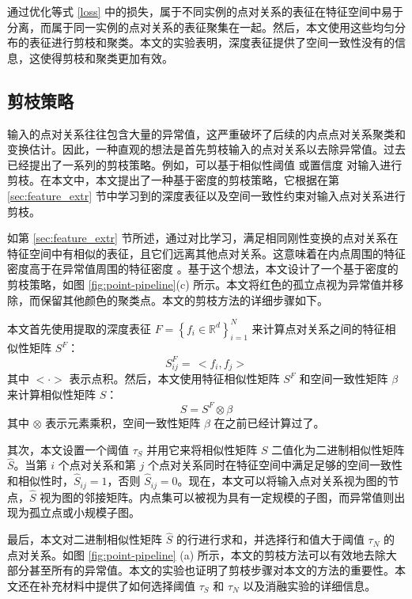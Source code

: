 通过优化等式 \ref{loss} 中的损失，属于不同实例的点对关系的表征在特征空间中易于分离，而属于同一实例的点对关系的表征聚集在一起。然后，本文使用这些均匀分布的表征进行剪枝和聚类。本文的实验表明，深度表征提供了空间一致性没有的信息，这使得剪枝和聚类更加有效。

\subsection{剪枝策略}\label{sec:pruning}
输入的点对关系往往包含大量的异常值，这严重破坏了后续的内点点对关系聚类和变换估计。因此，一种直观的想法是首先剪枝输入的点对关系以去除异常值。过去已经提出了一系列的剪枝策略。例如，可以基于相似性阈值 \cite{heckel2013subspace} 或置信度 \cite{zhao2021progressive} 对输入进行剪枝。在本文中，本文提出了一种基于密度的剪枝策略，它根据在第 \ref{sec:feature_extr} 节中学习到的深度表征以及空间一致性约束对输入点对关系进行剪枝。

如第 \ref{sec:feature_extr} 节所述，通过对比学习，满足相同刚性变换的点对关系在特征空间中有相似的表征，且它们远离其他点对关系。这意味着在内点周围的特征密度高于在异常值周围的特征密度 \cite{torr2002napsac} 。基于这个想法，本文设计了一个基于密度的剪枝策略，如图 \ref{fig:point-pipeline}(c) 所示。本文将红色的孤立点视为异常值并移除，而保留其他颜色的聚类点。本文的剪枝方法的详细步骤如下。

本文首先使用提取的深度表征 $F=\left\{f_{i} \in \mathbb{R}^{d}\right\}_{i=1}^{N}$ 来计算点对关系之间的特征相似性矩阵 $S^F$：
\begin{equation}
  S_{i j}^{F}= \, <f_{i}, f_{j}>
\end{equation}
其中 $<\cdot>$ 表示点积。然后，本文使用特征相似性矩阵 $S^F$ 和空间一致性矩阵 $\beta$ 来计算相似性矩阵 $S$：
\begin{equation}
  S=S^{F} \otimes \beta
\end{equation}
其中 $\otimes$ 表示元素乘积，空间一致性矩阵 $\beta$ 在之前已经计算过了。

其次，本文设置一个阈值 $\tau_{S}$ 并用它来将相似性矩阵 $S$ 二值化为二进制相似性矩阵 $\hat{S}$。当第 $i$ 个点对关系和第 $j$ 个点对关系同时在特征空间中满足足够的空间一致性和相似性时，$\hat{S}_{ij}=1$，否则 $\hat{S}_{i j}=0$。现在，本文可以将输入点对关系视为图的节点，$\hat{S}$ 视为图的邻接矩阵。内点集可以被视为具有一定规模的子图，而异常值则出现为孤立点或小规模子图。

最后，本文对二进制相似性矩阵 $\hat{S}$ 的行进行求和，并选择行和值大于阈值 $\tau_N$ 的点对关系。如图 \ref{fig:point-pipeline} (a) 所示，本文的剪枝方法可以有效地去除大部分甚至所有的异常值。本文的实验也证明了剪枝步骤对本文的方法的重要性。本文还在补充材料中提供了如何选择阈值 $\tau_S$ 和 $\tau_N$ 以及消融实验的详细信息。

